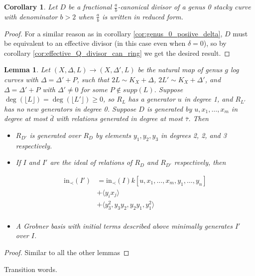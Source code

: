 \documentclass{amsart}
\theoremstyle{plain}
\newtheorem{lem}[thm]{Lemma}
\newtheorem{cor}[thm]{Corollary}
\theoremstyle{definition}
\theoremstyle{remark}
\numberwithin{equation}{section}
\newcommand \halfcan{L}
\newcommand \initial{\text{in}}
\begin{document}
\begin{cor}
Let $D$ be a fractional $\frac{a}{b}$-canonical divisor of a genus 0 stacky curve with denominator $b > 2$ when $\frac{a}{b}$ is written in reduced form.
\end{cor}
\begin{proof}
For a similar reason as in corollary \ref{cor:genus_0_posiive_delta}, $D$ must be equivalent to an effective divisor (in this case even when $\delta=0$), so by corollary \ref{cor:effective_Q_divisor_can_ring} we get the desired result.
\end{proof}

\begin{lem}\label{lem:add_point_effective_divisor_no_deg_1_generators}
Let $(X,\Delta,\halfcan)\to (X,\Delta',\halfcan)$ be the natural map of genus $g$ log curves with $\Delta=\Delta'+P$, such that $2\halfcan\sim K_X+\Delta$, $2\halfcan'\sim K_X+\Delta'$, and $\Delta=\Delta'+P$ with $\Delta'\ne 0$ for some $P\not\in supp(\halfcan)$.  
Suppose $\deg(\lfloor{\halfcan}\rfloor)=\deg(\lfloor \halfcan'\rfloor)\ge 0$, so $R_{\halfcan}$ has a
generator $u$ in degree 1, and $R_{\halfcan'}$ has no new generators in degree 0.  Suppose $D$ is generated by $u, x_1, \ldots, x_m$ in degree at most $\bar{d}$ with relations generated 
in degree at most $\bar{\tau}$.
Then 
\begin{itemize}
\item $R_{D'}$ is generated over $R_D$ by elements $y_1, y_2, y_3$ in degrees 2, 2, and 3 respectively.  
\item If $I$ and $I'$ are the ideal of relations of $R_D$ and $R_{D'}$ respectively, then 

\begin{align*}
	\initial_\prec(I') &= \initial_\prec(I) k[u, x_1, \ldots, x_m, y_1, \ldots, y_n] \\
										 &+ \langle y_i x_j \rangle \\
										 &+ \langle y_3^2, y_3y_2, y_2y_1, y_1^2\rangle \\
\end{align*}
\item A Grobner basis with initial terms described above minimally generates $I'$ over $I$.
\end{itemize}
\end{lem}
\begin{proof}
Similar to all the other lemmas
\end{proof}

Transition words.
\end{document}

